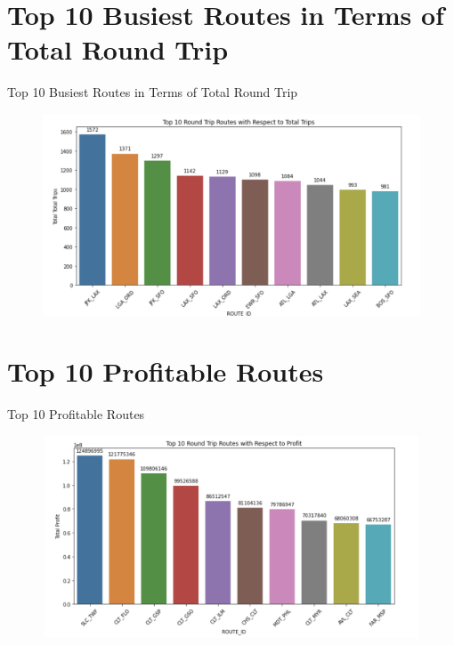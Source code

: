 \documentclass[aspectratio=1610]{beamer}
\begin{document}
\section{Top 10 Busiest Routes in Terms of Total Round Trip}
\begin{frame}{Top 10 Busiest Routes in Terms of Total Round Trip}
	\begin{figure}[htp!]
		\begin{center}
			\includegraphics[height=6cm, width= 12cm]{TopBusy} 
			\caption{}
			\label{TopBusy}
		\end{center}
	\end{figure}
\end{frame}

\section{Top 10 Profitable Routes}
\begin{frame}{Top 10 Profitable Routes}
	\begin{figure}[htp!]
		\begin{center}
			\includegraphics[height=6cm, width= 12cm]{TopProfitable} 
			\caption{}
			\label{TopProfitable}
		\end{center}
	\end{figure}
\end{frame}
\end{document}
